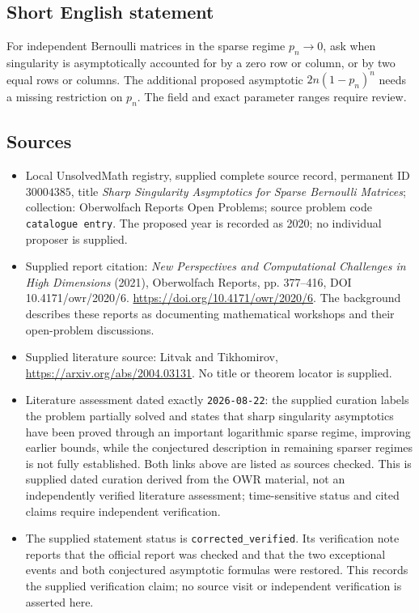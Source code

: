 \documentclass[11pt]{article}
\begin{document}
\subsection{Short English statement}
For independent Bernoulli matrices in the sparse regime \(p_n\to0\), ask when singularity is asymptotically accounted for by a zero row or column, or by two equal rows or columns. The additional proposed asymptotic \(2n(1-p_n)^n\) needs a missing restriction on \(p_n\). The field and exact parameter ranges require review.
\subsection{Sources}
\begin{itemize}
\item Local UnsolvedMath registry, supplied complete source record, permanent ID \(30004385\), title \emph{Sharp Singularity Asymptotics for Sparse Bernoulli Matrices}; collection: Oberwolfach Reports Open Problems; source problem code \texttt{catalogue entry}. The proposed year is recorded as 2020; no individual proposer is supplied.
\item Supplied report citation: \emph{New Perspectives and Computational Challenges in High Dimensions} (2021), Oberwolfach Reports, pp. 377--416, DOI 10.4171/owr/2020/6. \url{https://doi.org/10.4171/owr/2020/6}. The background describes these reports as documenting mathematical workshops and their open-problem discussions.
\item Supplied literature source: Litvak and Tikhomirov, \url{https://arxiv.org/abs/2004.03131}. No title or theorem locator is supplied.
\item Literature assessment dated exactly \texttt{2026-08-22}: the supplied curation labels the problem partially solved and states that sharp singularity asymptotics have been proved through an important logarithmic sparse regime, improving earlier bounds, while the conjectured description in remaining sparser regimes is not fully established. Both links above are listed as sources checked. This is supplied dated curation derived from the OWR material, not an independently verified literature assessment; time-sensitive status and cited claims require independent verification.
\item The supplied statement status is \texttt{corrected\_verified}. Its verification note reports that the official report was checked and that the two exceptional events and both conjectured asymptotic formulas were restored. This records the supplied verification claim; no source visit or independent verification is asserted here.
\end{itemize}
\end{document}
